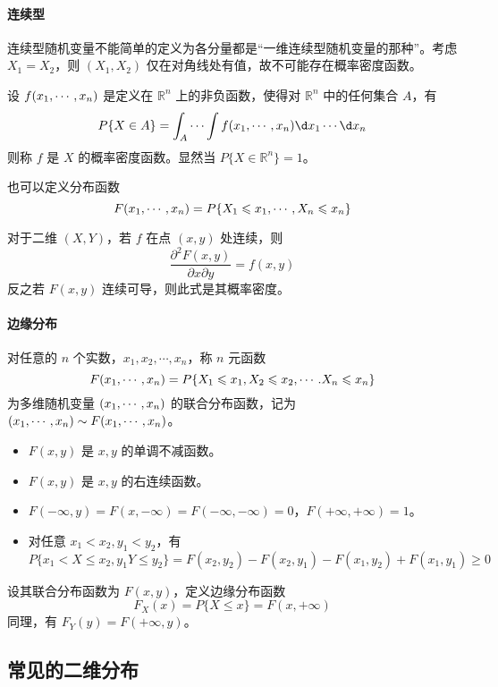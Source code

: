 \paragraph{连续型}
连续型随机变量不能简单的定义为各分量都是“一维连续型随机变量的那种”。考虑 $X_1 = X_2$，则 $(X_1, X_2)$ 仅在对角线处有值，故不可能存在概率密度函数。

\begin{definition}
	设 $f(x_1,\cdots,x_n)$ 是定义在 $\mathbb{R}^n$ 上的非负函数，使得对 $\mathbb{R}^n$ 中的任何集合 $A$，有
	\[ P\{X \in A\} = \int_A \cdots \int f(\seq{x}{n}) \d x_1 \cdots \d x_n \]
	则称 $f$ 是 $X$ 的概率密度函数。显然当 $P\{ X \in \mathbb{R}^n\} = 1$。
\end{definition}

也可以定义分布函数
\[ F(x_1,\cdots,x_n) = P\{X_1 \leqslant x_1, \cdots, X_n \leqslant x_n \} \]

对于二维 $(X, Y)$，若 $f$ 在点 $(x, y)$ 处连续，则
\[ \frac{\partial^2 F(x, y)}{\partial x \partial y} = f(x, y) \]
反之若 $F(x, y)$ 连续可导，则此式是其概率密度。

\paragraph{边缘分布}

对任意的 $n$ 个实数，$x_1, x_2, \cdots, x_n$，称 $n$ 元函数
\[ F(x_1,\cdots,x_n) = P\{X_1 \leqslant x_1, X_2 \leqslant x_2, \cdots. X_n \leqslant x_n\} \]
为多维随机变量 $(x_1,\cdots,x_n)$ 的联合分布函数，记为 $(x_1,\cdots,x_n) \sim F(x_1,\cdots,x_n)$。

\begin{itemize}
	\item $F(x, y)$ 是 $x, y$ 的单调不减函数。
	\item $F(x, y)$ 是 $x, y$ 的右连续函数。
	\item $F(-\infty, y) = F(x, -\infty) = F(-\infty, -\infty) = 0$，$F(+\infty, +\infty) = 1$。
	\item 对任意 $x_1 < x_2, y_1 < y_2$，有
	      \[ P\{x_1 < X \leqslant x_2, y_1 Y \leqslant y_2\} = F(x_2, y_2) - F(x_2, y_1) - F(x_1, y_2) + F(x_1, y_1) \geqslant 0 \]
\end{itemize}

设其联合分布函数为 $F(x,y)$，定义边缘分布函数
\[ F_X(x) = P\{X \leqslant x\} = F(x, +\infty) \]
同理，有 $F_Y(y) = F(+\infty, y)$。


\subsection{常见的二维分布}

